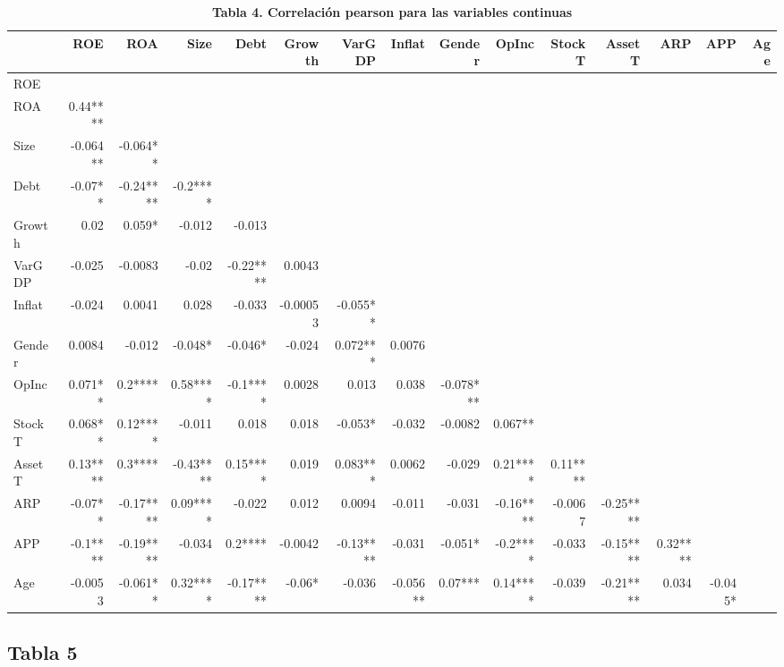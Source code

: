 \documentclass[
]{article}
\begin{document}
\begin{table}[!t]
\caption*{
{\large \textbf{Tabla 4. Correlación pearson para las variables continuas}}
} 
\fontsize{3.8pt}{4.5pt}\selectfont
\begin{tabular*}{\linewidth}{@{\extracolsep{\fill}}l|rrrrrrrrrrrrrr}
\toprule
 & ROE & ROA & Size & Debt & Growth & VarGDP & Inflat & Gender & OpInc & StockT & AssetT & ARP & APP & Age \\ 
\midrule\addlinespace[2.5pt]
ROE &  &  &  &  &  &  &  &  &  &  &  &  &  &  \\ 
ROA & 0.44**** &  &  &  &  &  &  &  &  &  &  &  &  &  \\ 
Size & -0.064** & -0.064** &  &  &  &  &  &  &  &  &  &  &  &  \\ 
Debt & -0.07** & -0.24**** & -0.2**** &  &  &  &  &  &  &  &  &  &  &  \\ 
Growth & 0.02 & 0.059* & -0.012 & -0.013 &  &  &  &  &  &  &  &  &  &  \\ 
VarGDP & -0.025 & -0.0083 & -0.02 & -0.22**** & 0.0043 &  &  &  &  &  &  &  &  &  \\ 
Inflat & -0.024 & 0.0041 & 0.028 & -0.033 & -0.00053 & -0.055** &  &  &  &  &  &  &  &  \\ 
Gender & 0.0084 & -0.012 & -0.048* & -0.046* & -0.024 & 0.072*** & 0.0076 &  &  &  &  &  &  &  \\ 
OpInc & 0.071** & 0.2**** & 0.58**** & -0.1**** & 0.0028 & 0.013 & 0.038 & -0.078*** &  &  &  &  &  &  \\ 
StockT & 0.068** & 0.12**** & -0.011 & 0.018 & 0.018 & -0.053* & -0.032 & -0.0082 & 0.067** &  &  &  &  &  \\ 
AssetT & 0.13**** & 0.3**** & -0.43**** & 0.15**** & 0.019 & 0.083*** & 0.0062 & -0.029 & 0.21**** & 0.11**** &  &  &  &  \\ 
ARP & -0.07** & -0.17**** & 0.09**** & -0.022 & 0.012 & 0.0094 & -0.011 & -0.031 & -0.16**** & -0.0067 & -0.25**** &  &  &  \\ 
APP & -0.1**** & -0.19**** & -0.034 & 0.2**** & -0.0042 & -0.13**** & -0.031 & -0.051* & -0.2**** & -0.033 & -0.15**** & 0.32**** &  &  \\ 
Age & -0.0053 & -0.061** & 0.32**** & -0.17**** & -0.06* & -0.036 & -0.056** & 0.07*** & 0.14**** & -0.039 & -0.21**** & 0.034 & -0.045* &  \\ 
\bottomrule
\end{tabular*}
\end{table}

\subsection{Tabla 5}\label{tabla-5}
\end{document}
